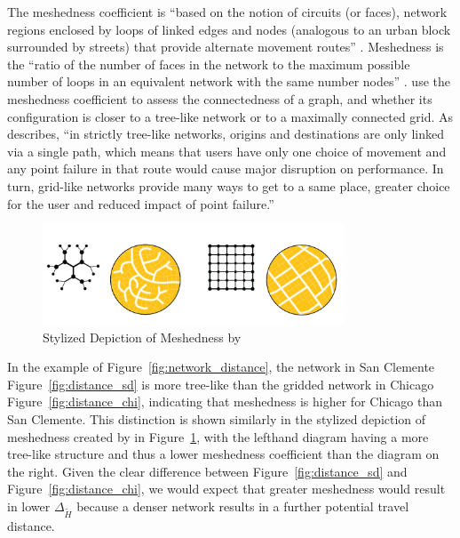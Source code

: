 \documentclass[
  10pt,
]{article}
\begin{document}
The meshedness coefficient is ``based on the notion of circuits (or
faces), network regions enclosed by loops of linked edges and nodes
(analogous to an urban block surrounded by streets) that provide
alternate movement routes'' \citep{feliciotti2018ResilienceUrban}.
Meshedness is the ``ratio of the number of faces in the network to the
maximum possible number of loops in an equivalent network with the same
number nodes'' \citep{fleischmann2022EvolutionUrban}.
\citet{buhl2006TopologicalPatterns} use the meshedness coefficient to
assess the connectedness of a graph, and whether its configuration is
closer to a tree-like network or to a maximally connected grid. As
\citet{feliciotti2018ResilienceUrban} describes, ``in strictly tree-like
networks, origins and destinations are only linked via a single path,
which means that users have only one choice of movement and any point
failure in that route would cause major disruption on performance. In
turn, grid-like networks provide many ways to get to a same place,
greater choice for the user and reduced impact of point failure.''

\begin{figure}
\hypertarget{fig:meshedness}{%
\centering
\includegraphics[width=0.8\textwidth,height=\textheight]{./figures/meshedness.png}
\caption{Stylized Depiction of Meshedness by
\citet{feliciotti2018ResilienceUrban}}\label{fig:meshedness}
}
\end{figure}

In the example of Figure~\ref{fig:network_distance}, the network in San
Clemente Figure~\ref{fig:distance_sd} is more tree-like than the gridded
network in Chicago Figure~\ref{fig:distance_chi}, indicating that
meshedness is higher for Chicago than San Clemente. This distinction is
shown similarly in the stylized depiction of meshedness created by
\citet{feliciotti2018ResilienceUrban} in Figure~\ref{fig:meshedness},
with the lefthand diagram having a more tree-like structure and thus a
lower meshedness coefficient than the diagram on the right. Given the
clear difference between Figure~\ref{fig:distance_sd} and
Figure~\ref{fig:distance_chi}, we would expect that greater meshedness
would result in lower \(\Delta_{\tilde{H}}\) because a denser network
results in a further potential travel distance.
\end{document}
